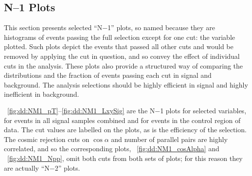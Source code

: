 \subsection{N--1 Plots}
This section presents selected ``N$-$1'' plots, so named because they are histograms of events passing the full selection except for one cut: the variable plotted.
Such plots depict the events that passed all other cuts and would be removed by applying the cut in question, and so convey the effect of individual cuts in the analysis.
These plots also provide a structured way of comparing the distributions and the fraction of events passing each cut in signal and background.
The analysis selections should be highly efficient in signal and highly inefficient in background.

\Figs~\ref{fig:dd:NM1_pT}--\ref{fig:dd:NM1_LxySig} are the N$-$1 plots for selected variables, for events in all \twoMu signal samples combined and for events in the control region  of data.
The cut values are labelled on the plots, as is the efficiency of the selection.
The cosmic rejection cuts on $\cos{\alpha}$ and number of parallel pairs are highly correlated, and so the corresponding plots, \Fig~\ref{fig:dd:NM1_cosAlpha} and \Fig~\ref{fig:dd:NM1_Npp}, omit both cuts from both sets of plots; for this reason they are actually ``N$-$2'' plots.

